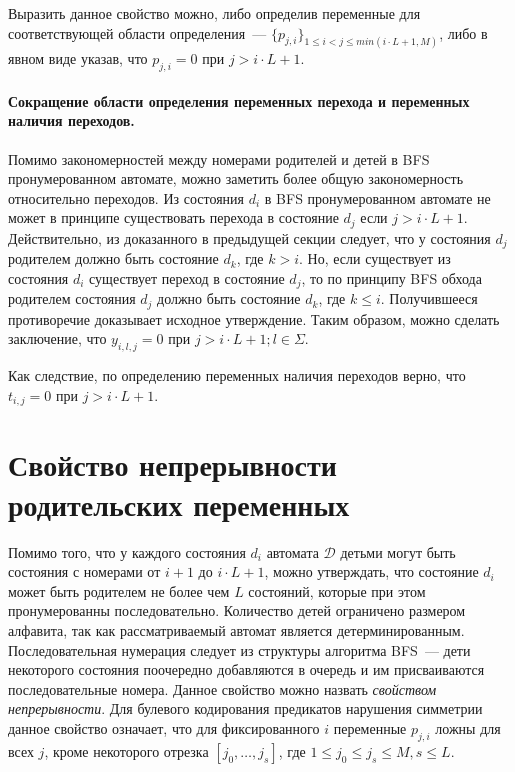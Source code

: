 
Выразить данное свойство можно, либо определив переменные для соответствующей области определения~{---} $\{p_{j,i}\}_{1 \leq i < j \leq min(i \cdot L + 1, M)}$, либо в явном виде указав, что $p_{j,i} = 0$ при $j > i \cdot L + 1$.

\paragraph{Сокращение области определения переменных перехода и переменных наличия переходов.}
Помимо закономерностей между номерами родителей и детей в BFS пронумерованном автомате, можно заметить более общую закономерность относительно переходов.
Из состояния $d_{i}$ в BFS пронумерованном автомате не может в принципе существовать перехода в состояние $d_{j}$ если $j > i \cdot L + 1$.
Действительно, из доказанного в предыдущей секции следует, что у состояния $d_{j}$ родителем должно быть состояние $d_{k}$, где $k > i$.
Но, если существует из состояния $d_{i}$ существует переход в состояние $d_{j}$, то по принципу BFS обхода родителем состояния $d_{j}$ должно быть состояние $d_{k}$, где $k \leq i$.
Получившееся противоречие доказывает исходное утверждение.
Таким образом, можно сделать заключение, что $y_{i,l,j} = 0$ при $j > i \cdot L + 1; l \in \Sigma$.

Как следствие, по определению переменных наличия переходов верно, что $t_{i, j} = 0$ при $j > i \cdot L + 1$.



\section{Свойство непрерывности родительских переменных}
\label{sec:pruning:continuity}

Помимо того, что у каждого состояния $d_{i}$ автомата $\mathcal{D}$ детьми могут быть состояния с номерами от $i + 1$ до $i \cdot L + 1$, можно утверждать, что состояние $d_{i}$ может быть родителем не более чем $L$ состояний, которые при этом пронумерованны последовательно.
Количество детей ограничено размером алфавита, так как рассматриваемый автомат является детерминированным.
Последовательная нумерация следует из структуры алгоритма BFS~{---} дети некоторого состояния поочередно добавляются в очередь и им присваиваются последовательные номера.
Данное свойство можно назвать \emph{свойством непрерывности}.
Для булевого кодирования предикатов нарушения симметрии данное свойство означает, что для фиксированного $i$ переменные $p_{j,i}$ ложны для всех $j$, кроме некоторого отрезка $[j_{0},\ldots,j_{s}]$, где $1 \leq j_{0} \leq j_{s} \leq M, s\leq L$.

